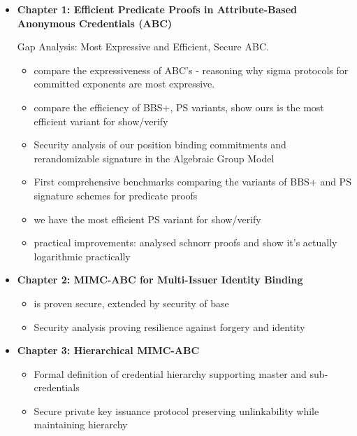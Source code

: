 \begin{itemize}
    \item \textbf{Chapter 1: Efficient Predicate Proofs in Attribute-Based Anonymous Credentials (ABC)}
    
    Gap Analysis: Most Expressive and Efficient, Secure ABC. 
    
    
    \begin{itemize}
        \item compare the expressiveness of ABC's - reasoning why sigma protocols for committed exponents are most expressive. 
        
        \item compare the efficiency of BBS+, PS variants, show ours is the most efficient variant for show/verify
    
        \item Security analysis of our position binding commitments and rerandomizable signature in the Algebraic Group Model
        
        \item First comprehensive benchmarks comparing the variants of BBS+ and PS signature schemes for predicate proofs

        \item we have the most efficient PS variant for show/verify
        
        \item practical improvements: analysed schnorr proofs and show it's actually logarithmic practically
        
    \end{itemize}

    \item \textbf{Chapter 2: MIMC-ABC for Multi-Issuer Identity Binding}
    \begin{itemize}
        \item is proven secure, extended by security of base
        \item Security analysis proving resilience against forgery and identity
    \end{itemize}

    \item \textbf{Chapter 3: Hierarchical MIMC-ABC}
    \begin{itemize}
        \item Formal definition of credential hierarchy supporting master and sub-credentials
        \item Secure private key issuance protocol preserving unlinkability while maintaining hierarchy
    \end{itemize}


\end{itemize}

